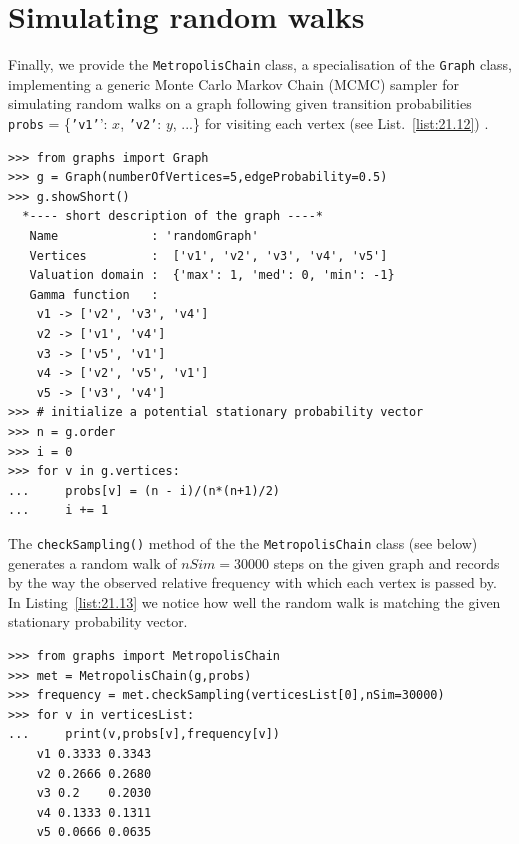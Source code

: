 \section{Simulating \Metropolis random walks}
\label{sec:21.6}

Finally, we provide the \texttt{MetropolisChain} class, a specialisation of the \texttt{Graph} class, implementing a generic Monte Carlo Markov Chain (MCMC) sampler for simulating random walks on a graph following given transition probabilities \texttt{probs} = \{\texttt{'v1'}’: $x$, \texttt{'v2'}: $y$, ...\} for visiting each vertex (see List.~\vref{list:21.12})
\citep{MET-1953}.
\begin{lstlisting}[caption={Simulating random walks on a graph},label=list:21.12]
>>> from graphs import Graph
>>> g = Graph(numberOfVertices=5,edgeProbability=0.5)
>>> g.showShort()
  *---- short description of the graph ----*
   Name             : 'randomGraph'
   Vertices         :  ['v1', 'v2', 'v3', 'v4', 'v5']
   Valuation domain :  {'max': 1, 'med': 0, 'min': -1}
   Gamma function   :
    v1 -> ['v2', 'v3', 'v4']
    v2 -> ['v1', 'v4']
    v3 -> ['v5', 'v1']
    v4 -> ['v2', 'v5', 'v1']
    v5 -> ['v3', 'v4']
>>> # initialize a potential stationary probability vector 
>>> n = g.order
>>> i = 0
>>> for v in g.vertices:
...     probs[v] = (n - i)/(n*(n+1)/2)
...     i += 1
\end{lstlisting}

The \texttt{checkSampling()} method  of the the \texttt{MetropolisChain} class (see below) generates a random walk of $nSim = 30000$ steps on the given graph and records by the way the observed relative frequency with which each vertex is passed by. In Listing~\vref{list:21.13} we notice how well the random walk is matching the given stationary probability vector.
\begin{lstlisting}[caption={Checking the quality of the MCMC sampler},label=list:21.13]
>>> from graphs import MetropolisChain     
>>> met = MetropolisChain(g,probs)
>>> frequency = met.checkSampling(verticesList[0],nSim=30000)
>>> for v in verticesList:
...     print(v,probs[v],frequency[v])   
    v1 0.3333 0.3343
    v2 0.2666 0.2680
    v3 0.2    0.2030
    v4 0.1333 0.1311
    v5 0.0666 0.0635
\end{lstlisting}


